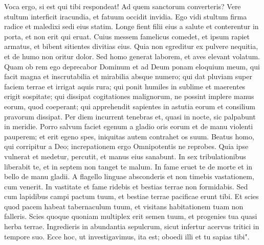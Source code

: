 \begin{biblechapter}  
\verse Voca ergo, si est qui tibi respondeat! Ad quem sanctorum converteris? 
\verse Vere stultum interficit iracundia, et fatuum occidit invidia. 
\verse Ego vidi stultum firma radice et maledixi sedi eius statim. 
\verse Longe fient filii eius a salute et conterentur in porta, et non erit qui eruat. 
\verse Cuius messem famelicus comedet, et ipsum rapiet armatus, et bibent sitientes divitias eius. 
\verse Quia non egreditur ex pulvere nequitia, et de humo non oritur dolor. 
\verse Sed homo generat laborem, et aves elevant volatum. 
\verse Quam ob rem ego deprecabor Dominum et ad Deum ponam eloquium meum, 
\verse qui facit magna et inscrutabilia et mirabilia absque numero; 
\verse qui dat pluviam super faciem terrae et irrigat aquis rura; 
\verse qui ponit humiles in sublime et maerentes erigit sospitate; 
\verse qui dissipat cogitationes malignorum, ne possint implere manus eorum, quod coeperant; 
\verse qui apprehendit sapientes in astutia eorum et consilium pravorum dissipat. 
\verse Per diem incurrent tenebras et, quasi in nocte, sic palpabunt in meridie. 
\verse Porro salvum faciet egenum a gladio oris eorum et de manu violenti pauperem; 
\verse et erit egeno spes, iniquitas autem contrahet os suum. 
\verse Beatus homo, qui corripitur a Deo; increpationem ergo Omnipotentis ne reprobes. 
\verse Quia ipse vulnerat et medetur, percutit, et manus eius sanabunt. 
\verse In sex tribulationibus liberabit te, et in septem non tanget te malum. 
\verse In fame eruet te de morte et in bello de manu gladii. 
\verse A flagello linguae absconderis et non timebis vastationem, cum venerit. 
\verse In vastitate et fame ridebis et bestias terrae non formidabis. 
\verse Sed cum lapidibus campi pactum tuum, et bestiae terrae pacificae erunt tibi. 
\verse Et scies quod pacem habeat tabernaculum tuum, et visitans habitationem tuam non falleris. 
\verse Scies quoque quoniam multiplex erit semen tuum, et progenies tua quasi herba terrae. 
\verse Ingredieris in abundantia sepulcrum, sicut infertur acervus tritici in tempore suo. 
\verse Ecce hoc, ut investigavimus, ita est; oboedi illi et tu sapias tibi". 
\end{biblechapter}

